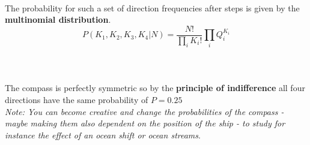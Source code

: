 \documentclass[12pt, a4paper]{scrartcl}
\begin{document}
\\

The probability for such a set of direction frequencies after steps is given by the \textbf{multinomial distribution}.\\
\begin{equation*}\boxed{P(K_1,K_2,K_3,K_4|N)=\frac{N!}{\prod_iK_i!}\prod_iQ_i^{K_i}
}\end{equation*}\\
\\
\\

The compass is perfectly symmetric so by the \textbf{principle of indifference} all four directions have the same probability of $P=0.25$\\
\textit{Note: You can become creative and change the probabilities of the compass - maybe making them also dependent on the position of the ship - to study for instance the effect of an ocean shift or ocean streams}.\\
\end{document}
